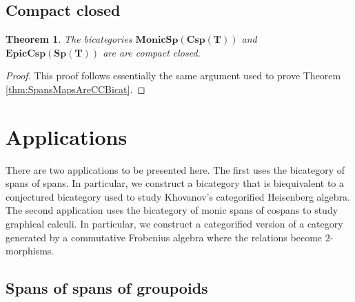 \documentclass[11pt]{amsart}
\newcommand{\bimonspcsp}[1]{\mathbf{MonicSp(Csp(#1))}}
\newcommand{\biepiccspsp}[1]{\mathbf{EpicCsp(Sp(#1))}}
\newtheorem{thm}{Theorem}[section]
\theoremstyle{remark}
\theoremstyle{definition}
\begin{document}
\subsection{Compact closed} %
\label{subsec.SpansCospansAreCCBicats}

\begin{thm}
	\label{thm:SpansCospansAreCCBicat}
	The bicategories $\bimonspcsp{T}$ and $\biepiccspsp{T}$ are are compact closed.
\end{thm}

\begin{proof}
	This proof follows essentially the same argument used to prove Theorem \ref{thm:SpansMapsAreCCBicat}.
\end{proof}

\section{Applications} %
\label{sec:Applications}

There are two applications to be presented here.  The first uses the bicategory of spans of spans.  In particular, we construct a bicategory that is biequivalent to a conjectured bicategory used to study Khovanov's categorified Heisenberg algebra.  The second application uses the bicategory of monic spans of cospans to study graphical calculi.  In particular, we construct a categorified version of a category generated by a commutative Frobenius algebra where the relations become $2$-morphisms.

\subsection{Spans of spans of groupoids} %
\label{subsec:SpanSpanGroupoid}
\end{document}
